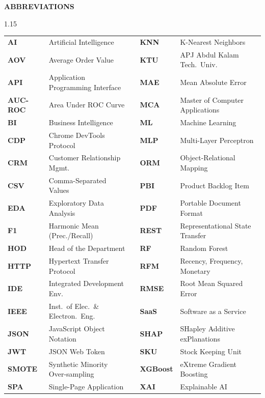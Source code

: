 \documentclass[12pt,a4paper]{article}
\begin{document}
\vspace*{0.2in}
\begin{center}{\large\bfseries ABBREVIATIONS}\end{center}
\vspace{0.15in}
\begin{spacing}{1.15}
\small
\noindent\begin{tabular}{ll p{0.4cm} ll}
\textbf{AI} & Artificial Intelligence & & \textbf{KNN} & K-Nearest Neighbors\\
\textbf{AOV} & Average Order Value & & \textbf{KTU} & APJ Abdul Kalam Tech.\ Univ.\\
\textbf{API} & Application Programming Interface & & \textbf{MAE} & Mean Absolute Error\\
\textbf{AUC-ROC} & Area Under ROC Curve & & \textbf{MCA} & Master of Computer Applications\\
\textbf{BI} & Business Intelligence & & \textbf{ML} & Machine Learning\\
\textbf{CDP} & Chrome DevTools Protocol & & \textbf{MLP} & Multi-Layer Perceptron\\
\textbf{CRM} & Customer Relationship Mgmt. & & \textbf{ORM} & Object-Relational Mapping\\
\textbf{CSV} & Comma-Separated Values & & \textbf{PBI} & Product Backlog Item\\
\textbf{EDA} & Exploratory Data Analysis & & \textbf{PDF} & Portable Document Format\\
\textbf{F1} & Harmonic Mean (Prec./Recall) & & \textbf{REST} & Representational State Transfer\\
\textbf{HOD} & Head of the Department & & \textbf{RF} & Random Forest\\
\textbf{HTTP} & Hypertext Transfer Protocol & & \textbf{RFM} & Recency, Frequency, Monetary\\
\textbf{IDE} & Integrated Development Env. & & \textbf{RMSE} & Root Mean Squared Error\\
\textbf{IEEE} & Inst.\ of Elec.\ \& Electron.\ Eng. & & \textbf{SaaS} & Software as a Service\\
\textbf{JSON} & JavaScript Object Notation & & \textbf{SHAP} & SHapley Additive exPlanations\\
\textbf{JWT} & JSON Web Token & & \textbf{SKU} & Stock Keeping Unit\\
\textbf{SMOTE} & Synthetic Minority Over-sampling & & \textbf{XGBoost} & eXtreme Gradient Boosting\\
\textbf{SPA} & Single-Page Application & & \textbf{XAI} & Explainable AI\\
\end{tabular}
\end{spacing}
\newpage
\end{document}
